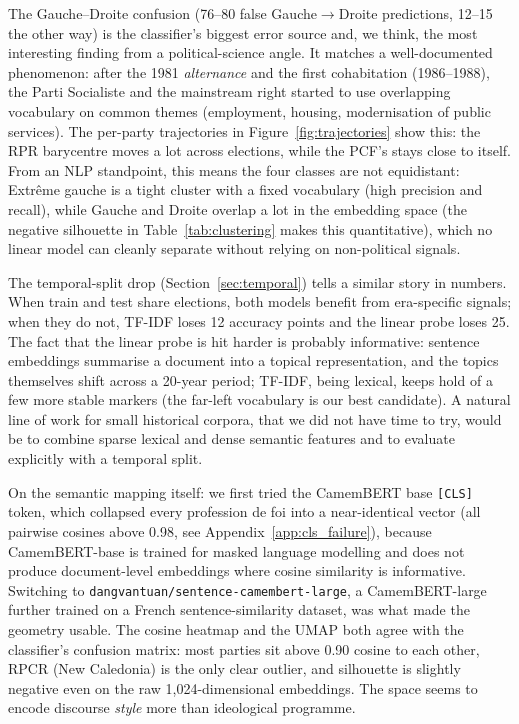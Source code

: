 \documentclass{article}
\begin{document}
The Gauche--Droite confusion (76--80 false Gauche$\to$Droite predictions, 12--15 the other way) is the classifier's biggest error source and, we think, the most interesting finding from a political-science angle. It matches a well-documented phenomenon: after the 1981 \textit{alternance} and the first cohabitation (1986--1988), the Parti Socialiste and the mainstream right started to use overlapping vocabulary on common themes (employment, housing, modernisation of public services). The per-party trajectories in Figure~\ref{fig:trajectories} show this: the RPR barycentre moves a lot across elections, while the PCF's stays close to itself. From an NLP standpoint, this means the four classes are not equidistant: Extr\^{e}me gauche is a tight cluster with a fixed vocabulary (high precision and recall), while Gauche and Droite overlap a lot in the embedding space (the negative silhouette in Table~\ref{tab:clustering} makes this quantitative), which no linear model can cleanly separate without relying on non-political signals.

The temporal-split drop (Section~\ref{sec:temporal}) tells a similar story in numbers. When train and test share elections, both models benefit from era-specific signals; when they do not, TF-IDF loses 12 accuracy points and the linear probe loses 25. The fact that the linear probe is hit harder is probably informative: sentence embeddings summarise a document into a topical representation, and the topics themselves shift across a 20-year period; TF-IDF, being lexical, keeps hold of a few more stable markers (the far-left vocabulary is our best candidate). A natural line of work for small historical corpora, that we did not have time to try, would be to combine sparse lexical and dense semantic features and to evaluate explicitly with a temporal split.

On the semantic mapping itself: we first tried the CamemBERT base \texttt{[CLS]} token, which collapsed every profession de foi into a near-identical vector (all pairwise cosines above 0.98, see Appendix~\ref{app:cls_failure}), because CamemBERT-base is trained for masked language modelling and does not produce document-level embeddings where cosine similarity is informative. Switching to \texttt{dangvantuan/sentence-camembert-large}, a CamemBERT-large further trained on a French sentence-similarity dataset, was what made the geometry usable. The cosine heatmap and the UMAP both agree with the classifier's confusion matrix: most parties sit above 0.90 cosine to each other, RPCR (New Caledonia) is the only clear outlier, and silhouette is slightly negative even on the raw 1{,}024-dimensional embeddings. The space seems to encode discourse \emph{style} more than ideological programme.
\end{document}
